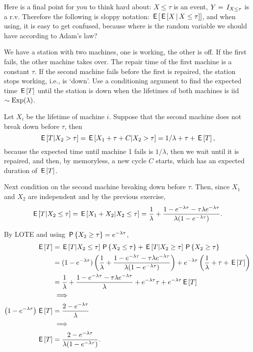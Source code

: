 \begin{exercise}
\begin{solution}
Here is a final point for you to think hard about: ${X\leq \tau}$ is an event, $Y=\1{X \leq \tau}$ is a r.v. Therefore the following is sloppy notation: $\E{\E{X\given X\leq \tau}}$, and when using, it is easy to get confused, because where is the random variable we should have according to Adam's law?
\end{solution}
\end{exercise}


\begin{exercise}
We have a station with two machines, one is working, the other is off.
If the first fails, the other machine takes over.
The repair time of the first machine is a constant $\tau$.
If the second machine fails before the first is repaired, the station stops working, i.e., is `down'.
Use a conditioning argument to find the expected time $\E T$ until the station is down when the lifetimes of both machines is iid $\sim\Exp{\lambda}$.
\begin{solution}
Let $X_i$ be the lifetime of machine $i$. Suppose that  the second machine does not break down before $\tau$, then
\begin{equation}
  \label{eq:27}
\E{T| X_{2}>\tau} = \E{X_{1} + \tau + C |X_2>\tau} = 1/\lambda + \tau + \E T,
\end{equation}
because the expected time until machine 1 fails is $1/\lambda$, then we wait until it is repaired, and then, by memoryless, a new cycle $C$ starts, which has an expected duration of $\E T$.

Next condition on the second machine breaking down before $\tau$. Then, since $X_{1}$ and $X_2$ are independent and by the previous exercise,
\begin{equation}
  \label{eq:27}
\E{T| X_{2}\leq \tau} = \E{X_{1} + X_{2}  |X_2\leq \tau} = \frac{1}{\lambda} + \frac{ 1- e^{-\lambda \tau}- \tau \lambda  e^{-\lambda \tau}}{\lambda(1-e^{-\lambda \tau})}.
\end{equation}

By LOTE and using $\P{X_{2}\geq \tau} = e^{-\lambda \tau}$,
\begin{align}
  \label{eq:24}
\E T
&=
\E{T| X_{2}\leq \tau} \P{X_{2}\leq \tau} + \E{T| X_{2}\geq \tau} \P{X_{2}\geq \tau} \\
&=(1-e^{-\lambda \tau})\left( \frac 1\lambda+
\frac{ 1- e^{-\lambda \tau}- \tau \lambda  e^{-\lambda \tau}}{\lambda(1-e^{-\lambda \tau})} \right)
+e^{-\lambda \tau}\left( \frac{1}{\lambda} + \tau + \E T \right) \\
&=\frac{1}{\lambda} + \frac{ 1- e^{-\lambda \tau}- \tau \lambda  e^{-\lambda \tau}}{\lambda}
+e^{-\lambda \tau} \tau + e^{-\lambda \tau}\E T \\
&\implies \\
\left( 1-e^{-\lambda \tau} \right) \E T
&=\frac{2-e^{-\lambda \tau}}{\lambda} \\
&\implies \\
\E T
&=\frac{2-e^{-\lambda \tau}}{\lambda(1-e^{-\lambda \tau})}.
\end{align}


\end{solution}
\end{exercise}
